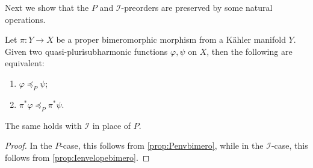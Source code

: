Next we show that the $P$ and $\mathcal{I}$-preorders are preserved by some natural operations.

\begin{lemma}\label{lma:Ipartorderinv}
Let $\pi\colon Y\rightarrow X$ be a proper bimeromorphic morphism from a Kähler manifold $Y$.
    Given two quasi-plurisubharmonic functions $\varphi,\psi$ on $X$, then the following are equivalent:
    \begin{enumerate}
        \item\label{itm:lma:Ipartorderinv:1} $\varphi\preceq_{P} \psi$;
        \item\label{itm:lma:Ipartorderinv:2} $\pi^*\varphi\preceq_{P} \pi^*\psi$.
    \end{enumerate}
    The same holds with $\mathcal{I}$ in place of $P$.
\end{lemma}
\begin{proof}
   In the $P$-case, this follows from \cref{prop:Penvbimero}, while in the $\mathcal{I}$-case, this follows from \cref{prop:Ienvelopebimero}.
\end{proof}

